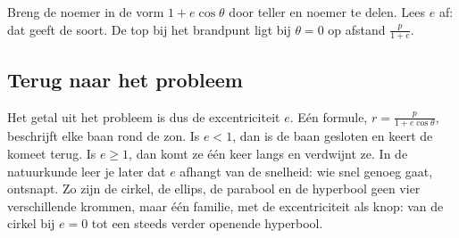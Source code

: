 \begin{werkwijze}
Breng de noemer in de vorm $1 + e\cos\theta$ door teller en noemer te delen. Lees $e$ af: dat geeft de soort. De top bij het brandpunt ligt bij $\theta = 0$ op afstand $\tfrac{p}{1 + e}$.
\end{werkwijze}


\begin{oefeningen}
\end{oefeningen}

\subsection{Terug naar het probleem}


Het getal uit het probleem is dus de excentriciteit $e$. Eén formule, $r = \tfrac{p}{1 + e\cos\theta}$, beschrijft elke baan rond de zon. Is $e < 1$, dan is de baan gesloten en keert de komeet terug. Is $e \geqslant 1$, dan komt ze één keer langs en verdwijnt ze. In de natuurkunde leer je later dat $e$ afhangt van de snelheid: wie snel genoeg gaat, ontsnapt. Zo zijn de cirkel, de ellips, de parabool en de hyperbool geen vier verschillende krommen, maar één familie, met de excentriciteit als knop: van de cirkel bij $e = 0$ tot een steeds verder openende hyperbool.

